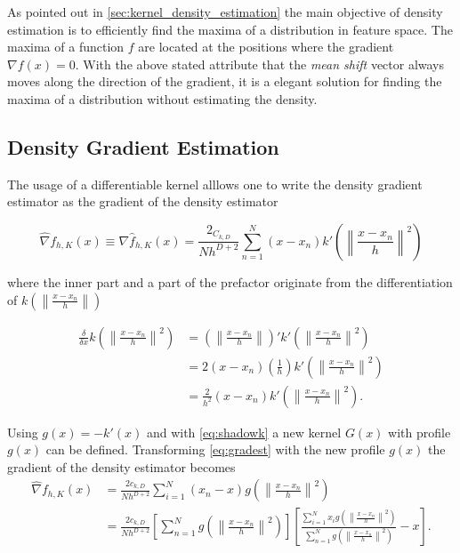 As pointed out in \autoref{sec:kernel_density_estimation} the main objective of
density estimation is to efficiently find the maxima of a distribution in
feature space. The maxima of a function $f$ are located at the positions where
the gradient $\nabla f(x) = 0$. With the above stated attribute that the
\emph{mean shift} vector always moves along the direction of the gradient, it is
a elegant solution for finding the maxima of a distribution without estimating
the density.

\subsection{Density Gradient Estimation} %
\label{sub:gradient_estimation}
The usage of a differentiable kernel alllows one to write the density gradient 
estimator as the gradient of the density estimator

\begin{equation}\label{eq:gradest}
	\hat{\nabla} f_{h,K}(x) \equiv \nabla \hat{f}_{h,K}(x) = 
	\frac{2_{C_{k,D}}}{Nh^{D+2}}%
	\sum_{n = 1}^N (x - x_n)k' 
	\left( \left\lVert \frac{x - x_n}{h} \right\rVert^2 \right)
\end{equation}

where the inner part and a part of the prefactor originate from the differentiation
of $k\left( \left\lVert \frac{x - x_n}{h} \right\rVert \right)$

\begin{equation}\label{eq:kerndiff}
	\begin{split}
		\frac{\delta}{\delta x}
		k\left( \left\lVert \frac{x - x_n}{h} \right\rVert^2 \right) & = 
		\left( \left\lVert \frac{x - x_n}{h} \right\rVert \right)'
		k'\left( \left\lVert \frac{x - x_n}{h} \right\rVert^2 \right) \\ & =
		2 \left( x - x_n \right) \left( \frac{1}{h} \right) 
		k'\left( \left\lVert \frac{x - x_n}{h} \right\rVert^2 \right) \\ & =
		\frac{2}{h^2}(x - x_n)
		k'\left( \left\lVert \frac{x - x_n}{h} \right\rVert^2 \right).
	\end{split}
\end{equation}

Using $g(x) = -k'(x)$ and with \autoref{eq:shadowk} a new kernel $G(x)$ with
profile $g(x)$ can be defined. Transforming \autoref{eq:gradest} with the new
profile $g(x)$ the gradient of the density estimator becomes
\begin{subequations}
	\begin{align}
	\hat{\nabla} f_{h,K}(x) & = \frac{2c_{k,D}}{Nh^{D+2}}\sum_{i=1}^N \left(x_n -
    x\right)g\left(\left\lVert \frac{x - x_n}{h} \right\rVert^2\right) \label{eq:gradest1}\\ & 
	= \frac{2c_{k,D}}{Nh^{D+2}} \left[ \sum_{n=1}^N g\left(\left\lVert
	\frac{x - x_n}{h} \right\rVert^2\right) \right] \left[
	\frac{\sum_{i=1}^N x_i g\left(\left\lVert \frac{x - x_n}{h}
	\right\rVert^2\right)}{\sum_{n=1}^N g\left(\left\lVert \frac{x - x_n}{h}
	\right\rVert^2\right)} - x \right].
	\label{eq:gradest2}
	\end{align}
\end{subequations}

